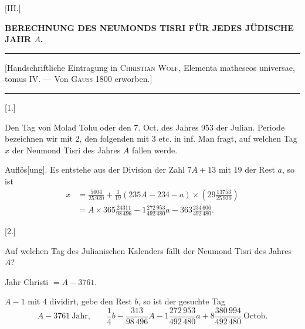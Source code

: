 \clearpage\begingroup\NoSourceHead{}
\makeatletter\tagsleft@true\let\veqno\@@leqno\makeatother
\begin{center}
[III.]\par\medskip
\textbf{BERECHNUNG DES NEUMONDS TISRI FÜR JEDES JÜDISCHE JAHR $A$.}\par\medskip
\rule{\textwidth}{.35pt}\par
{\small [Handschriftliche Eintragung in \textsc{Christian Wolf}, Elementa matheseos universae, tomus IV. --- Von \textsc{Gauss} 1800 erworben.]}\par
\rule{\textwidth}{.35pt}
\end{center}
\begin{center}[1.]\end{center}
\noindent\hspace*{\parindent}Den Tag von Molad Tohu oder den 7. Oct. des Jahres 953 der Julian. Periode bezeichnen wir mit 2, den folgenden mit 3 etc. in inf. Man fragt, auf welchen Tag $x$ der Neumond Tisri des Jahres $A$ fallen werde.

Auflös[ung]. Es entstehe aus der Division der Zahl $7A+13$ mit $19$ der Rest $a$, so ist
\[
\begin{aligned}
x&=\frac{5604}{25\,920}+\frac{1}{19}(235A-234-a)\times\left(29\frac{13753}{25\,920}\right)\\
&=A\times365\frac{24311}{98\,496}-1\frac{272\,953}{492\,480}a-363\frac{234\,606}{492\,480}.
\end{aligned}
\]
\begin{center}[2.]\end{center}
\noindent\hspace*{\parindent}Auf welchen Tag des Julianischen Kalenders fällt der Neumond Tisri des Jahres $A$?

Jahr Christi $=A-3761$.

$A-1$ mit $4$ dividirt, gebe den Rest $b$, so ist der gesuchte Tag
\[
A-3761\ \text{Jahr,}\qquad \frac{1}{4}b-\frac{313}{98\,496}A-1\frac{272\,953}{492\,480}a+8\frac{380\,994}{492\,480}\ \text{Octob.}
\]

